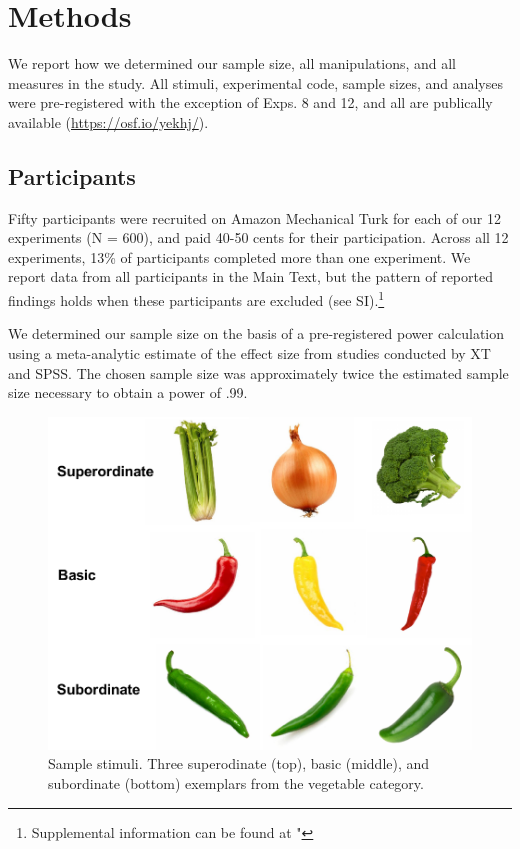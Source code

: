 \documentclass[english,floatsintext,man]{apa6}
\theoremstyle{definition}
\theoremstyle{definition}
\theoremstyle{remark}
\begin{document}
\section{Methods}\label{methods}

We report how we determined our sample size, all manipulations, and all
measures in the study. All stimuli, experimental code, sample sizes, and
analyses were pre-registered with the exception of Exps. 8 and 12, and
all are publically available (\url{https://osf.io/yekhj/}).

\subsection{Participants}\label{participants}

Fifty participants were recruited on Amazon Mechanical Turk for each of
our 12 experiments (N = 600), and paid 40-50 cents for their
participation. Across all 12 experiments, 13\% of participants completed
more than one experiment. We report data from all participants in the
Main Text, but the pattern of reported findings holds when these
participants are excluded (see
SI).\footnote{Supplemental information can be found at "}

We determined our sample size on the basis of a pre-registered power
calculation using a meta-analytic estimate of the effect size from
studies conducted by XT and SPSS. The chosen sample size was
approximately twice the estimated sample size necessary to obtain a
power of .99.

\begin{figure}[t!]
 
 {\centering \includegraphics[width=0.5\linewidth]{figs/stim} 
 
 }
 
 \caption{Sample stimuli. Three superodinate (top), basic (middle), and subordinate (bottom) exemplars from the vegetable category.}\label{fig:unnamed-chunk-1}
 \end{figure}
\end{document}
